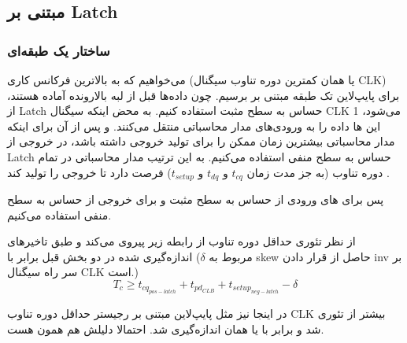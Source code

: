 \subsection{ مبتنی بر Latch}
\subsubsection{ساختار یک طبقه‌ای}


می‌خواهیم که به بالاترین فرکانس کاری (یا همان کمترین دوره تناوب سیگنال CLK) برای پایپ‌لاین تک طبقه مبتنی بر  برسیم.
چون داده‌ها قبل از لبه بالارونده آماده هستند، از Latch حساس به سطح مثبت استفاده کنیم. به محض اینکه سیگنال CLK 1  می‌شود، این ها داده را به ورودی‌های مدار محاسباتی منتقل می‌کنند.
و پس از آن برای اینکه مدار محاسباتی بیشترین زمان ممکن را برای تولید خروجی داشته باشد، در خروجی از Latch حساس به سطح منفی استفاده می‌کنیم. به این ترتیب مدار محاسباتی در تمام دوره تناوب (به جز مدت زمان $t_{cq}$ و $t_{dq}$ و $t_{setup}$) فرصت دارد تا خروجی را تولید کند .

پس برای های ورودی از حساس به سطح مثبت و برای خروجی از حساس به سطح منفی استفاده می‌کنیم.

از نظر تئوری حداقل دوره تناوب از رابطه زیر پیروی می‌کند و طبق تاخیر‌های اندازه‌گیری شده در دو بخش قبل برابر با 
($\delta$ مربوط به skew حاصل از قرار دادن inv بر سر راه سیگنال CLK است.)
{\Large
    $$
        T_c \geq t_{cq_{pos-latch}} + t_{pd_{CLB}} + t_{setup_{neg-latch}} - \delta
    $$
}

در اینجا نیز مثل پایپ‌لاین مبتنی بر رجیستر حداقل دوره تناوب CLK بیشتر از تئوری شد و برابر با  یا همان  اندازه‌گیری شد.
احتمالا دلیلش هم همون هست.


\newpage

